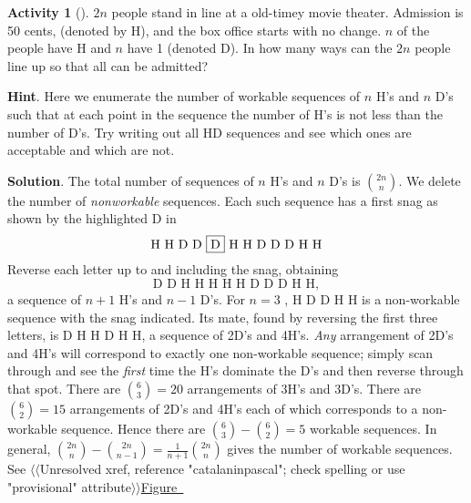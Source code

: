 \documentclass[10pt,]{book}
\theoremstyle{plain}
\theoremstyle{definition}
\theoremstyle{definition}
\theoremstyle{definition}
\newtheorem{activity}[project]{Activity}
\numberwithin{equation}{chapter}
\newcommand{\alert}{\fbox}
\begin{document}
\begin{activity}[]\label{act-hdseq}
\hypertarget{p-994}{}%
\(2n\) people stand in line at a old-timey movie theater. Admission is 50 cents, (denoted by H), and the box office starts with no change. \(n\) of the people have H and \(n\) have \textdollar{}1 (denoted D). In how many ways can the \(2n\) people line up so that all can be admitted?%
\par\smallskip%
\noindent\textbf{Hint}.\hypertarget{hint-113}{}\quad%
\hypertarget{p-995}{}%
Here we enumerate the number of workable sequences of \(n\) H's and \(n\) D's such that at each point in the sequence the number of H's is not less than the number of D's.  Try writing out all HD sequences and see which ones are acceptable and which are not.%
\par\smallskip%
\noindent\textbf{Solution}.\hypertarget{solution-76}{}\quad%
\hypertarget{p-996}{}%
The total number of sequences of \(n\) H's and \(n\) D's is \(\binom{2n}{n}\). We delete the number of \emph{nonworkable} sequences. Each such sequence has a first snag as shown by the highlighted D in%
\begin{equation*}
\text{H\ H\ D\ D\ \alert{D}\ H\ H\ D\ D\ D\ H\ H}
\end{equation*}
Reverse each letter up to and including the snag, obtaining%
\begin{equation*}
\text{D D H H H H H D D D H H},
\end{equation*}
a sequence of \(n+1\) H's and \(n-1\) D's. For \(n = 3\) , H D \alert{D} D H H is a non-workable sequence with the snag indicated. Its mate, found by reversing the first three letters, is D H H D H H, a sequence of 2D's and 4H's. \emph{Any} arrangement of 2D's and 4H's will correspond to exactly one non-workable sequence; simply scan through and see the \emph{first} time the H's dominate the D's and then reverse through that spot. There are \(\binom{6}{3}
= 20\) arrangements of 3H's and 3D's. There are \(\binom{6}{2}
= 15\) arrangements of 2D's and 4H's each of which corresponds to a non-workable sequence. Hence there are \(\binom{6}{3}
-\binom{6}{2} = 5\) workable sequences. In general, \(\binom{2n}{n}  - \binom{2n}{n - 1} = \frac{1}{n + 1}\binom{2n}{n}\) gives the number of workable sequences. See {$\langle\langle$Unresolved xref, reference "catalaninpascal"; check spelling or use "provisional" attribute$\rangle\rangle$}\hyperlink{}{Figure~}%
\end{activity}
\end{document}
